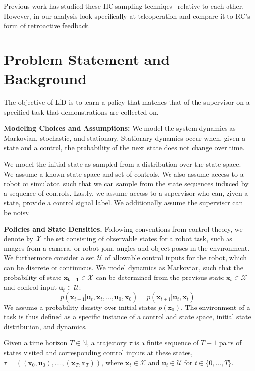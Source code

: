 \documentclass[10pt, conference]{ieeeconf}      %
\newcommand{\bu}{\mathbf{u}}
\newcommand{\bx}{\mathbf{x}}
\begin{document}
Previous work has studied these HC sampling techniqes~\cite{akgun2012keyframe,akgun2012novel} relative to each other. However, in our analysis look specifically at teleoperation and compare it to RC's form of retroactive feedback. 

\section{Problem Statement and Background}\label{sec:PS}
The objective of LfD is to learn a policy that matches that of the supervisor on a specified task that demonstrations are collected on.

\noindent\textbf{Modeling Choices and Assumptions:}  We model the system dynamics as Markovian, stochastic, and stationary. Stationary dynamics occur when, given a state and a control, the probability of the next state does not change over time. 

We model the initial state as sampled from a distribution over the state space.
We assume a known state space and set of controls. We also assume access to a robot or simulator, such that we  can sample from the state sequences induced by a sequence of controls.
Lastly, we assume access to a supervisor who can, given a state, provide a control signal label.
We additionally assume the supervisor can be noisy. 

\noindent\textbf{Policies and State Densities.}
Following conventions from control theory, we denote by $\mathcal{X}$ the set consisting of observable states for a robot task, such as images from a camera, or robot joint angles and object poses in the environment.
We furthermore consider a set $\mathcal{U}$ of allowable control inputs for the robot, which can be discrete or
continuous. We model dynamics as Markovian, such that the probability of state $\mathbf{x_{t+1}}\in
\mathcal{X}$ can be determined from the previous state $\mathbf{x}_t\in\mathcal{X}$ and control input $\mathbf{u}_t\in
\mathcal{U}$: 
$$p(\bx_{t+1}|\bu_{t},\bx_{t}, \ldots, \bu_{0}, \bx_{0})=p(\bx_{t+1}|\bu_{t}, \bx_t)$$
We assume a probability density over initial states $p(\bx_0)$.
The environment of a task is thus defined as a specific instance of a control and state space, initial state distribution, and dynamics. 



Given a time horizon $T\in \mathbb{N}$, a trajectory $\tau$ is a finite sequence of $T+1$ pairs of states visited and corresponding
control inputs at these states, $\tau = ((\mathbf{x}_0,\mathbf{u}_0), ...., (\mathbf{x}_T,\mathbf{u}_T))$, where $\bx_t\in \mathcal{X}$
and $\bu_t\in \mathcal{U}$ for $t\in \{0, \ldots, T\}$.
\end{document}
